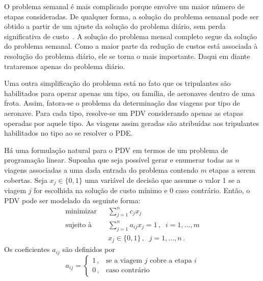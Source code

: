 \documentclass[12pt,a4paper]{article}
\newcommand{\ev}{\, ,}                                       %
\newcommand{\ep}{\, .}                                       %
\begin{document}
O problema semanal é mais complicado porque envolve um maior número de etapas consideradas. De
qualquer forma, a solução do problema semanal pode ser obtido a partir de um ajuste da solução do
problema diário, sem perda significativa de custo~\cite{gopalakrishnan05}. A solução do problema
mensal completo segue da solução do problema semanal. Como a maior parte da redução de custos está
associada à resolução do problema diário, ele se torna o mais importante. Daqui em diante trataremos
apenas do problema diário.

Uma outra simplificação do problema está no fato que os tripulantes são habilitados para operar
apenas um tipo, ou família, de aeronaves dentro de uma frota. Assim, fatora-se o problema da
determinação das viagens por tipo de aeronave. Para cada tipo, resolve-se um PDV considerando apenas
as etapas operadas por aquele tipo. As viagens assim geradas são atribuídas aos tripulantes
habilitados no tipo ao se resolver o PDE.

Há uma formulação natural para o PDV em termos de um problema de programação linear. Suponha que
seja possível gerar e enumerar todas as $n$ viagens associadas a uma dada entrada do problema
contendo $m$ etapas a serem cobertas. Seja $x_j \in \{0, 1\}$ uma variável de decisão que assume o
valor 1 se a viagem $j$ for escolhida na solução de custo mínimo e 0 caso contrário. Então, o PDV
pode ser modelado da seguinte forma:
%
\begin{eqnarray} \label{eq:sppv}
	\text{minimizar} && \displaystyle \sum_{j=1}^n c_j x_j \nonumber \\
	\text{sujeito à} && \displaystyle \sum_{j=1}^n a_{ij} x_j = 1 \ev \;\; i = 1, \ldots, m \\
		               && x_j \in \{0, 1\} \ev \;\; j = 1, \ldots, n \ep \nonumber
\end{eqnarray} 
%
Os coeficientes $a_{ij}$ são definidos por
%
\begin{equation*}
	a_{ij} = \left\{
	\begin{array}{ll}
			1 \ev & \text{se a viagem $j$ cobre a etapa $i$} \\
			0 \ev & \text{caso contrário}
	\end{array}
	\right.
\end{equation*}
\end{document}
